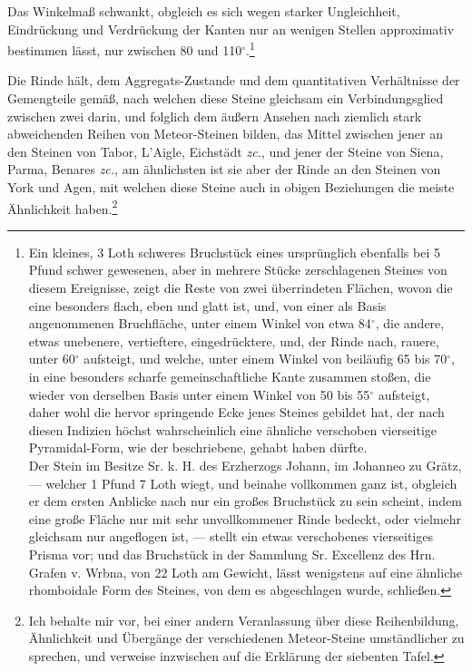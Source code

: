 \documentclass[a4paper, 11pt, oneside, german]{article}
\begin{document}
Das Winkelmaß schwankt, obgleich es sich wegen starker Ungleichheit, Eindrückung und Verdrückung der Kanten nur an wenigen Stellen approximativ bestimmen lässt, nur zwischen 80 und 110$^{\circ}$.\footnote{Ein kleines, 3 Loth schweres Bruchstück eines ursprünglich ebenfalls bei 5 Pfund schwer gewesenen, aber in mehrere Stücke zerschlagenen Steines von diesem Ereignisse, zeigt die Reste von zwei überrindeten Flächen, wovon die eine besonders flach, eben und glatt ist, und, von einer als Basis angenommenen Bruchfläche, unter einem Winkel von etwa 84$^{\circ}$, die andere, etwas unebenere, vertieftere, eingedrücktere, und, der Rinde nach, rauere, unter 60$^{\circ}$ aufsteigt, und welche, unter einem Winkel von beiläufig 65 bis 70$^{\circ}$, in eine besonders scharfe gemeinschaftliche Kante zusammen stoßen, die wieder von derselben Basis unter einem Winkel von 50 bis 55$^{\circ}$ aufsteigt, daher wohl die hervor springende Ecke jenes Steines gebildet hat, der nach diesen Indizien höchst wahrscheinlich eine ähnliche verschoben vierseitige Pyramidal-Form, wie der beschriebene, gehabt haben dürfte.\\
Der Stein im Besitze Sr. k. H. des Erzherzogs Johann, im Johanneo zu Grätz, --- welcher 1 Pfund 7 Loth wiegt, und beinahe vollkommen ganz ist, obgleich er dem ersten Anblicke nach nur ein großes Bruchstück zu sein scheint, indem eine große Fläche nur mit sehr unvollkommener Rinde bedeckt, oder vielmehr gleichsam nur angeflogen ist, --- stellt ein etwas verschobenes vierseitiges Prisma vor; und das Bruchstück in der Sammlung Sr. Excellenz des Hrn. Grafen v. Wrbna, von 22 Loth am Gewicht, lässt wenigstens auf eine ähnliche rhomboidale Form des Steines, von dem es abgeschlagen wurde, schließen.}

Die Rinde hält, dem Aggregats-Zustande und dem quantitativen Verhältnisse der Gemengteile gemäß, nach welchen diese Steine gleichsam ein Verbindungsglied zwischen zwei darin, und folglich dem äußern Ansehen nach ziemlich stark abweichenden Reihen von Meteor-Steinen bilden, das Mittel zwischen jener an den Steinen von Tabor, L'Aigle, Eichstädt \emph{zc.}, und jener der Steine von Siena, Parma, Benares \emph{zc.}, am ähnlichsten ist sie aber der Rinde an den Steinen von York und Agen, mit welchen diese Steine auch in obigen Beziehungen die meiste Ähnlichkeit haben.\footnote{Ich behalte mir vor, bei einer andern Veranlassung über diese Reihenbildung, Ähnlichkeit und Übergänge der verschiedenen Meteor-Steine umständlicher zu sprechen, und verweise inzwischen auf die Erklärung der siebenten Tafel.}
\end{document}
